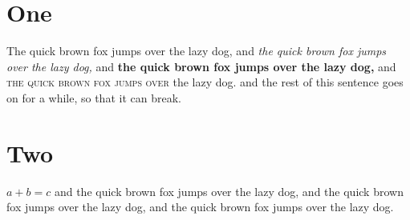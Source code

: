 \documentclass{article}
\begin{document}
\section{One}
The quick brown fox jumps over the lazy dog, and {\itshape the quick brown fox jumps over the lazy dog,} and
{\bfseries the quick brown fox jumps over the lazy dog,} and \textsc{the quick brown fox jumps over} the lazy dog.
 and the rest of this sentence goes on for a while, so that it can break.
\newpage
\section{Two}
$a+b=c$ and the quick brown fox jumps over the lazy dog, and the quick brown fox jumps over the lazy dog,
and the quick brown fox jumps over the lazy dog.
\end{document}

